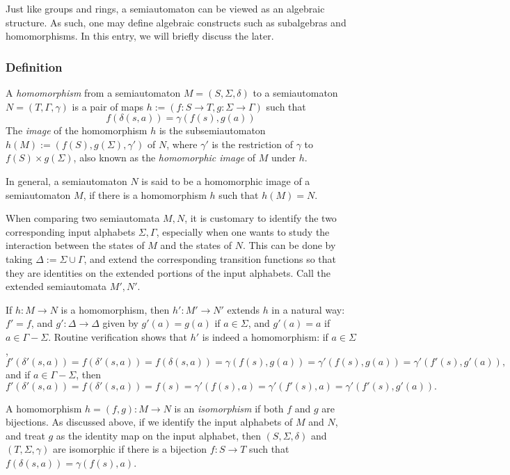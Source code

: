 \documentclass[12pt]{article}
\begin{document}
Just like groups and rings, a semiautomaton can be viewed as an algebraic structure.  As such, one may define algebraic constructs such as subalgebras and homomorphisms.  In this entry, we will briefly discuss the later.

\subsubsection*{Definition}

A \emph{homomorphism} from a semiautomaton $M=(S,\Sigma,\delta)$ to a semiautomaton $N=(T,\Gamma,\gamma)$ is a pair of maps $h:=(f:S\to T,g:\Sigma \to \Gamma)$ such that
$$f(\delta(s,a))= \gamma(f(s),g(a))$$
The \emph{image} of the homomorphism $h$ is the subsemiautomaton $h(M):=(f(S),g(\Sigma),\gamma')$ of $N$, where $\gamma'$ is the restriction of $\gamma$ to $f(S)\times g(\Sigma)$, also known as the \emph{homomorphic image} of $M$ under $h$.  

In general, a semiautomaton $N$ is said to be a homomorphic image of a semiautomaton $M$, if there is a homomorphism $h$ such that $h(M)=N$.

When comparing two semiautomata $M,N$, it is customary to identify the two corresponding input alphabets $\Sigma, \Gamma$, especially when one wants to study the interaction between the states of $M$ and the states of $N$.  This can be done by taking $\Delta:=\Sigma\cup \Gamma$, and extend the corresponding transition functions so that they are identities on the extended portions of the input alphabets.  Call the extended semiautomata $M',N'$.

If $h:M\to N$ is a homomorphism, then $h':M'\to N'$ extends $h$ in a natural way: $f'=f$, and $g':\Delta \to \Delta$ given by $g'(a)=g(a)$ if $a\in \Sigma$, and $g'(a)=a$ if $a\in \Gamma-\Sigma$.  Routine verification shows that $h'$ is indeed a homomorphism: if $a\in \Sigma$, $$f'(\delta'(s,a))=f(\delta'(s,a))=f(\delta(s,a))=\gamma(f(s),g(a))=\gamma'(f(s),g(a))=\gamma'(f'(s),g'(a)),$$ and if $a\in \Gamma-\Sigma$, then $$f'(\delta'(s,a))=f(\delta'(s,a))=f(s)=\gamma'(f(s),a)=\gamma'(f'(s),a)=\gamma'(f'(s),g'(a)).$$

A homomorphism $h=(f,g):M\to N$ is an \emph{isomorphism} if both $f$ and $g$ are bijections.  As discussed above, if we identify the input alphabets of $M$ and $N$, and treat $g$ as the identity map on the input alphabet, then $(S,\Sigma,\delta)$ and $(T,\Sigma,\gamma)$ are isomorphic if there is a bijection $f:S\to T$ such that $f(\delta(s,a))=\gamma(f(s),a)$.
\end{document}
